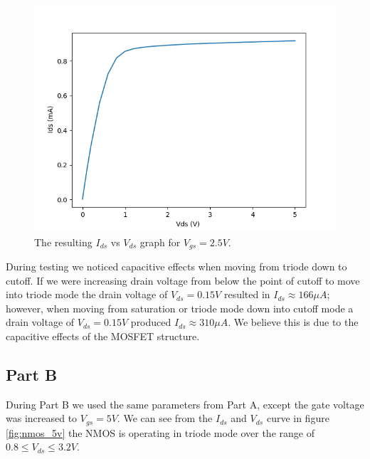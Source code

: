 		\begin{figure}[h!]
		\centering
		\includegraphics[scale=0.75]{./data/nmos.png}
		\caption{The resulting $I_{ds}$ vs $V_{ds}$ graph for $V_{gs}=2.5V$.}
		\label{fig:nmos}
		\end{figure}

		\FloatBarrier
		During testing we noticed capacitive effects when moving from triode down to cutoff. 
		If we were increasing drain voltage from below the point of cutoff to move into triode mode the drain voltage of $V_{ds}=0.15V$ resulted in $I_{ds}\approx 166 \mu A$;
		however, when moving from saturation or triode mode down into cutoff mode a drain voltage of $V_{ds}=0.15 V$ produced $I_{ds}\approx 310 \mu A$.
		We believe this is due to the capacitive effects of the MOSFET structure.

		\subsection{Part B}
		During Part B we used the same parameters from Part A, except the gate voltage was increased to $V_{gs} = 5V$. 
		We can see from the $I_{ds}$ and $V_{ds}$ curve in figure \ref{fig:nmos_5v} the NMOS is operating in triode mode over the range of $0.8 \le V_{ds} \le 3.2V$.

		\FloatBarrier

